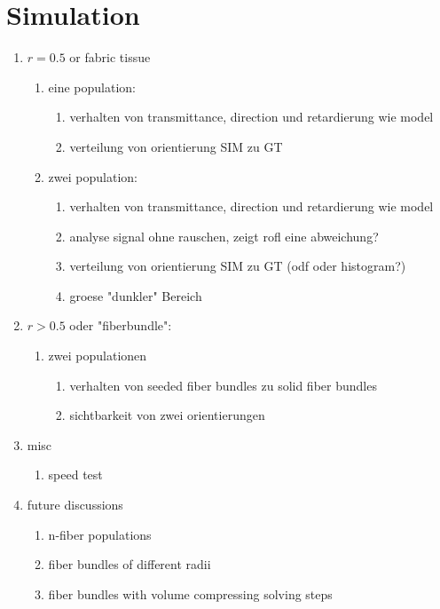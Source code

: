 \section{Simulation}
% 
\begin{enumerate}
\item $r=0.5$ or fabric tissue 
\begin{enumerate}
\item eine population:
\begin{enumerate}
    \item verhalten von transmittance, direction und retardierung wie model
    \item verteilung von orientierung SIM zu GT
\end{enumerate}
% 
\item zwei population:
\begin{enumerate}
    \item verhalten von transmittance, direction und retardierung wie model
    \item analyse signal ohne rauschen, zeigt rofl eine abweichung?
    \item verteilung von orientierung SIM zu GT (odf oder histogram?)
    \item groese "dunkler" Bereich
\end{enumerate}
\end{enumerate}
% 
\item $r > 0.5$ oder "fiberbundle":
\begin{enumerate}
\item zwei populationen
\begin{enumerate}
    \item verhalten von seeded fiber bundles zu solid fiber bundles
    \item sichtbarkeit von zwei orientierungen
\end{enumerate}
\end{enumerate}
% 
\item misc
\begin{enumerate}
    \item speed test
\end{enumerate}
% 
\item future discussions
\begin{enumerate}
    \item n-fiber populations
    \item fiber bundles of different radii
    \item fiber bundles with volume compressing solving steps
\end{enumerate}
\end{enumerate}
% 
% 
% 
